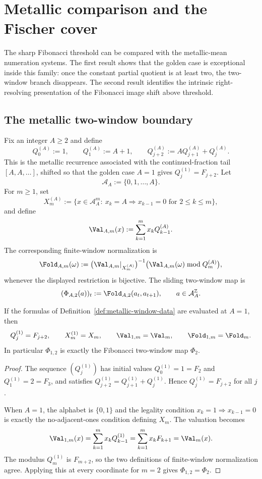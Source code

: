 \section{Metallic comparison and the Fischer cover}\label{sec:metallic-cover}

The sharp Fibonacci threshold can be compared with the metallic-mean
numeration systems. The first result shows that the golden case is exceptional
inside this family: once the constant partial quotient is at least two, the
two-window branch disappears. The second result identifies the intrinsic
right-resolving presentation of the Fibonacci image shift above threshold.

\subsection{The metallic two-window boundary}

\begin{definition}\label{def:metallic-window-data}
Fix an integer $A\ge 2$ and define
\[
Q_0^{(A)}:=1,\qquad Q_1^{(A)}:=A+1,\qquad
Q_{j+2}^{(A)}:=A Q_{j+1}^{(A)}+Q_j^{(A)}.
\]
This is the metallic recurrence associated with the continued-fraction tail
$[A,A,\ldots]$, shifted so that the golden case $A=1$ gives
$Q_j^{(1)}=F_{j+2}$.
Let
\[
\mathcal A_A:=\{0,1,\ldots,A\}.
\]
For $m\ge 1$, set
\[
X_m^{(A)}
:=
\{x\in \mathcal A_A^m:\ x_k=A\Rightarrow x_{k-1}=0
\text{ for }2\le k\le m\},
\]
and define
\[
\Val_{A,m}(x):=\sum_{k=1}^m x_k Q_{k-1}^{(A)}.
\]
The corresponding finite-window normalization is
\[
\Fold_{A,m}(\omega)
:=
\bigl(\Val_{A,m}|_{X_m^{(A)}}\bigr)^{-1}
\bigl(\Val_{A,m}(\omega)\bmod Q_m^{(A)}\bigr),
\]
whenever the displayed restriction is bijective.  The sliding two-window map is
\[
(\Phi_{A,2}(a))_t:=\Fold_{A,2}(a_t,a_{t+1}),
\qquad a\in \mathcal A_A^{\mathbb Z}.
\]
\end{definition}

\begin{lemma}\label{lem:metallic-golden-member}
If the formulas of Definition~\ref{def:metallic-window-data} are evaluated at
$A=1$, then
\[
Q_j^{(1)}=F_{j+2},\qquad
X_m^{(1)}=X_m,\qquad
\Val_{1,m}=\Val_m,\qquad
\Fold_{1,m}=\Fold_m.
\]
In particular $\Phi_{1,2}$ is exactly the Fibonacci two-window map $\Phi_2$.
\end{lemma}

\begin{proof}
The sequence $(Q_j^{(1)})$ has initial values $Q_0^{(1)}=1=F_2$ and
$Q_1^{(1)}=2=F_3$, and satisfies
$Q_{j+2}^{(1)}=Q_{j+1}^{(1)}+Q_j^{(1)}$.  Hence
$Q_j^{(1)}=F_{j+2}$ for all $j$.

When $A=1$, the alphabet is $\{0,1\}$ and the legality condition
$x_k=1\Rightarrow x_{k-1}=0$ is exactly the no-adjacent-ones condition
defining $X_m$.  The valuation becomes
\[
\Val_{1,m}(x)=\sum_{k=1}^m x_kQ_{k-1}^{(1)}
=\sum_{k=1}^m x_kF_{k+1}=\Val_m(x).
\]
The modulus $Q_m^{(1)}$ is $F_{m+2}$, so the two definitions of finite-window
normalization agree.  Applying this at every coordinate for $m=2$ gives
$\Phi_{1,2}=\Phi_2$.
\end{proof}

